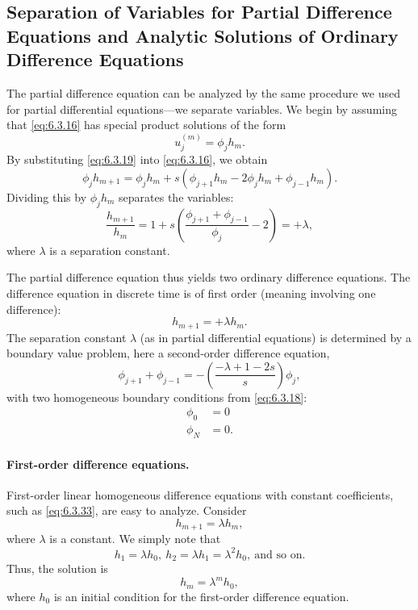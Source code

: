 \subsection{Separation of Variables for Partial Difference Equations and Analytic Solutions of Ordinary Difference Equations}
\label{sec:fd-heat-separation}

The partial difference equation can be analyzed by the same procedure we used for partial differential equations---we separate variables.  We begin by assuming that \eqref{eq:6.3.16} has special product solutions of the form
\begin{equation}
\boxed{u_j^{(m)} = \phi_j h_m.}
\label{eq:6.3.32}
\end{equation}
By substituting \eqref{eq:6.3.19} into \eqref{eq:6.3.16}, we obtain
\[
\phi_j h_{m+1} = \phi_j h_m + s(\phi_{j+1}h_m - 2\phi_j h_m + \phi_{j-1}h_m).
\]
Dividing this by $\phi_j h_m$ separates the variables:
\[
\frac{h_{m+1}}{h_m} = 1 + s\left(\frac{\phi_{j+1} + \phi_{j-1}}{\phi_j} - 2\right) = +\lambda,
\]
where $\lambda$ is a separation constant.

The partial difference equation thus yields two ordinary difference equations.  The difference equation in discrete time is of first order (meaning involving one difference):
\begin{equation}
\boxed{h_{m+1} = +\lambda h_m.}
\label{eq:6.3.33}
\end{equation}
The separation constant $\lambda$ (as in partial differential equations) is determined by a boundary value problem, here a second-order difference equation,
\begin{equation}
\boxed{\phi_{j+1} + \phi_{j-1} = -\left(\frac{-\lambda + 1 - 2s}{s}\right)\phi_j,}
\label{eq:6.3.34}
\end{equation}
with two homogeneous boundary conditions from \eqref{eq:6.3.18}:
\begin{align}
\phi_0 &= 0 \label{eq:6.3.35} \\
\phi_N &= 0. \label{eq:6.3.36}
\end{align}

\paragraph{First-order difference equations.}
First-order linear homogeneous difference equations with constant coefficients, such as \eqref{eq:6.3.33}, are easy to analyze.  Consider
\begin{equation}
h_{m+1} = \lambda h_m,
\label{eq:6.3.37}
\end{equation}
where $\lambda$ is a constant.  We simply note that
\[
h_1 = \lambda h_0,\ h_2 = \lambda h_1 = \lambda^2 h_0,\ \text{and so on.}
\]
Thus, the solution is
\begin{equation}
h_m = \lambda^m h_0,
\label{eq:6.3.38}
\end{equation}
where $h_0$ is an initial condition for the first-order difference equation.

